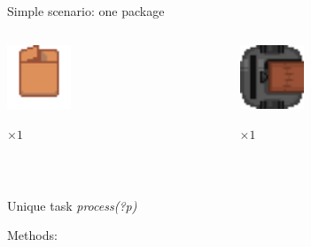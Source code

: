 \begin{frame}[fragile]{Simple scenario: one package}
    \centering
    \begin{columns}
        \begin{column}{0.5\textwidth}
            \centering
            \includegraphics[width = 0.3\textwidth]{images/godot/package.png}
            
            \LARGE \emph{$\times 1$}
        \end{column}
        \begin{column}{0.5\textwidth}
            \centering
            \includegraphics[width = 0.3\textwidth]{images/godot/robot_texture.png}
            
            \LARGE \emph{$\times 1$}
        \end{column}
    \end{columns}
    \pause
    \centering

    ~~

    Unique task \textit{process(?p)}

    Methods:
    

\end{frame}
